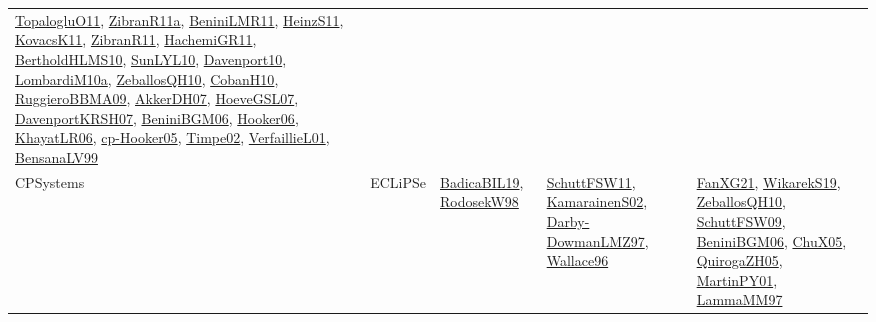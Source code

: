 {\begin{longtable}{lp{3cm}>{\raggedright}p{6cm}>{\raggedright}p{6cm}p{8cm}}
\href{articles/TopalogluO11.pdf}{TopalogluO11}\cite{TopalogluO11}, \href{papers/ZibranR11a.pdf}{ZibranR11a}\cite{ZibranR11a}, \href{articles/BeniniLMR11.pdf}{BeniniLMR11}\cite{BeniniLMR11}, \href{papers/HeinzS11.pdf}{HeinzS11}\cite{HeinzS11}, \href{articles/KovacsK11.pdf}{KovacsK11}\cite{KovacsK11}, \href{papers/ZibranR11.pdf}{ZibranR11}\cite{ZibranR11}, \href{articles/HachemiGR11.pdf}{HachemiGR11}\cite{HachemiGR11}, \href{papers/BertholdHLMS10.pdf}{BertholdHLMS10}\cite{BertholdHLMS10}, \href{papers/SunLYL10.pdf}{SunLYL10}\cite{SunLYL10}, \href{papers/Davenport10.pdf}{Davenport10}\cite{Davenport10}, \href{articles/LombardiM10a.pdf}{LombardiM10a}\cite{LombardiM10a}, \href{articles/ZeballosQH10.pdf}{ZeballosQH10}\cite{ZeballosQH10}, \href{papers/CobanH10.pdf}{CobanH10}\cite{CobanH10}, \href{articles/RuggieroBBMA09.pdf}{RuggieroBBMA09}\cite{RuggieroBBMA09}, \href{papers/AkkerDH07.pdf}{AkkerDH07}\cite{AkkerDH07}, \href{papers/HoeveGSL07.pdf}{HoeveGSL07}\cite{HoeveGSL07}, \href{papers/DavenportKRSH07.pdf}{DavenportKRSH07}\cite{DavenportKRSH07}, \href{papers/BeniniBGM06.pdf}{BeniniBGM06}\cite{BeniniBGM06}, \href{articles/Hooker06.pdf}{Hooker06}\cite{Hooker06}, \href{articles/KhayatLR06.pdf}{KhayatLR06}\cite{KhayatLR06}, \href{papers/cp-Hooker05.pdf}{cp-Hooker05}\cite{cp-Hooker05}, \href{articles/Timpe02.pdf}{Timpe02}\cite{Timpe02}, \href{papers/VerfaillieL01.pdf}{VerfaillieL01}\cite{VerfaillieL01}, \href{articles/BensanaLV99.pdf}{BensanaLV99}\cite{BensanaLV99}\\
CPSystems & ECLiPSe & \href{papers/BadicaBIL19.pdf}{BadicaBIL19}\cite{BadicaBIL19}, \href{papers/RodosekW98.pdf}{RodosekW98}\cite{RodosekW98} & \href{articles/SchuttFSW11.pdf}{SchuttFSW11}\cite{SchuttFSW11}, \href{papers/KamarainenS02.pdf}{KamarainenS02}\cite{KamarainenS02}, \href{articles/Darby-DowmanLMZ97.pdf}{Darby-DowmanLMZ97}\cite{Darby-DowmanLMZ97}, \href{articles/Wallace96.pdf}{Wallace96}\cite{Wallace96} & \href{articles/FanXG21.pdf}{FanXG21}\cite{FanXG21}, \href{articles/WikarekS19.pdf}{WikarekS19}\cite{WikarekS19}, \href{articles/ZeballosQH10.pdf}{ZeballosQH10}\cite{ZeballosQH10}, \href{papers/SchuttFSW09.pdf}{SchuttFSW09}\cite{SchuttFSW09}, \href{papers/BeniniBGM06.pdf}{BeniniBGM06}\cite{BeniniBGM06}, \href{papers/ChuX05.pdf}{ChuX05}\cite{ChuX05}, \href{papers/QuirogaZH05.pdf}{QuirogaZH05}\cite{QuirogaZH05}, \href{articles/MartinPY01.pdf}{MartinPY01}\cite{MartinPY01}, \href{articles/LammaMM97.pdf}{LammaMM97}\cite{LammaMM97}\\

\end{longtable}}
